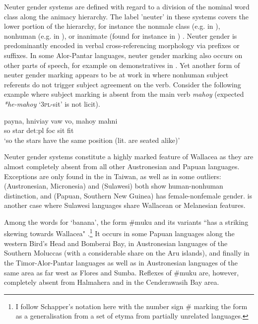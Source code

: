 Neuter gender systems are defined with regard to a division of the nominal word class along the animacy hierarchy. The label 'neuter' in these systems covers the lower portion of the hierarchy, for instance the nonmale class (e.g. in ), nonhuman (e.g. in ), or inanimate (found for instance in ) \citep[128]{schapper2015wallacea}. Neuter gender is predominantly encoded in verbal cross-referencing morphology via prefixes or suffixes. In some Alor-Pantar languages, neuter gender marking also occurs on other parts of speech, for example on demonstratives in . Yet another form of neuter gender marking appears to be at work in  where nonhuman subject referents do not trigger subject agreement on the verb. Consider the following example where subject marking is absent from the main verb \textit{mahoy} (expected \textit{*he-mahoy} `\textsc{3pl}-sit' is not licit).

\ea 
\gll payna, hniviay vaw vo, mahoy mahni \\
so star \acs{det}:\acs{pl} \acs{foc} sit fit \\
\glft `so the stars have the same position
(lit. are seated alike)' \\ 
\endgl
\xe

Neuter gender systems constitute a highly marked feature of Wallacea as they are almost completely absent from all other Austronesian and Papuan languages. Exceptions are only found in the  in Taiwan, as well as in some outliers:  (Austronesian, Micronesia) and  (Sulawesi) both show human-nonhuman distinction, and  (Papuan, Southern New Guinea) has female-nonfemale gender.  is another case where Sulawesi languages share Wallacean or Melanesian features.

Among the words for `banana', the form \#muku and its variants ``has a striking skewing towards Wallacea" \citep[132]{schapper2015wallacea}.\footnote{I follow Schapper's notation here with the number sign \# marking the form as a generalisation from a set of etyma from partially unrelated languages.} It occurs in some Papuan languages along the western Bird's Head and Bomberai Bay, in Austronesian languages of the Southern Moluccas (with a considerable share on the Aru islands), and finally in the Timor-Alor-Pantar languages as well as in Austronesian languages of the same area as far west as Flores and Sumba. Reflexes of \#muku are, however, completely absent from Halmahera and in the Cenderawasih Bay area.

